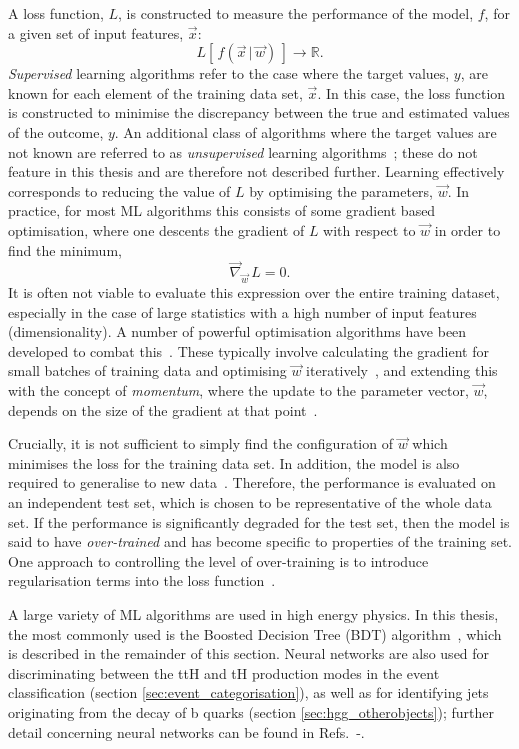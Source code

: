 A loss function, $L$, is constructed to measure the performance of the model, $f$, for a given set of input features, $\vec{x}$:
\begin{equation}
    L[\,f(\vec{x}\,|\,\vec{w})\,] \rightarrow \mathbb{R}.
\end{equation}
\noindent
\textit{Supervised} learning algorithms refer to the case where the target values, $y$, are known for each element of the training data set, $\vec{x}$. In this case, the loss function is constructed to minimise the discrepancy between the true and estimated values of the outcome, $y$. An additional class of algorithms where the target values are not known are referred to as \textit{unsupervised} learning algorithms~\cite{}; these do not feature in this thesis and are therefore not described further. Learning effectively corresponds to reducing the value of $L$ by optimising the parameters, $\vec{w}$. In practice, for most ML algorithms this consists of some gradient based optimisation, where one descents the gradient of $L$ with respect to $\vec{w}$ in order to find the minimum,
\begin{equation}\label{eq:loss_minimum}
    \vec{\nabla}_{\vec{w}}\,L = 0.
\end{equation}
\noindent
It is often not viable to evaluate this expression over the entire training dataset, especially in the case of large statistics with a high number of input features (dimensionality). A number of powerful optimisation algorithms have been developed to combat this~\cite{}. These typically involve calculating the gradient for small batches of training data and optimising $\vec{w}$ iteratively~\cite{}, and extending this with the concept of \textit{momentum}, where the update to the parameter vector, $\vec{w}$, depends on the size of the gradient at that point~\cite{}.

Crucially, it is not sufficient to simply find the configuration of $\vec{w}$ which minimises the loss for the training data set. In addition, the model is also required to generalise to new data~\cite{}. Therefore, the performance is evaluated on an independent test set, which is chosen to be representative of the whole data set. If the performance is significantly degraded for the test set, then the model is said to have \textit{over-trained} and has become specific to properties of the training set. One approach to controlling the level of over-training is to introduce regularisation terms into the loss function~\cite{}.

A large variety of ML algorithms are used in high energy physics. In this thesis, the most commonly used is the Boosted Decision Tree (BDT) algorithm~\cite{}, which is described in the remainder of this section. Neural networks are also used for discriminating between the ttH and tH production modes in the \Hgg event classification (section \ref{sec:event_categorisation}), as well as for identifying jets originating from the decay of b quarks (section \ref{sec:hgg_otherobjects}); further detail concerning neural networks can be found in Refs.~\cite{}-\cite{}.

